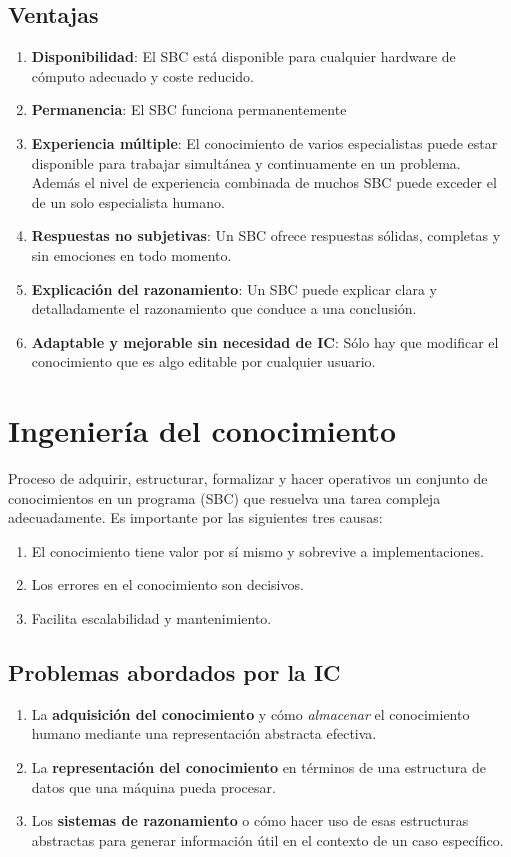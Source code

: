 \documentclass[12pt]{article}
\begin{document}
\subsection{Ventajas}
\begin{enumerate}
\item \textbf{Disponibilidad}: El SBC está disponible para cualquier hardware de cómputo adecuado y coste reducido.
\item \textbf{Permanencia}: El SBC funciona permanentemente
\item \textbf{Experiencia múltiple}: El conocimiento de varios especialistas puede estar disponible para trabajar simultánea y continuamente en un problema. Además el nivel de experiencia combinada de muchos SBC puede exceder el de un solo especialista humano.
\item \textbf{Respuestas no subjetivas}: Un SBC ofrece respuestas sólidas, completas y sin emociones en todo momento.
\item \textbf{Explicación del razonamiento}: Un SBC puede explicar clara y detalladamente el razonamiento que conduce a una conclusión.
\item \textbf{Adaptable y mejorable sin necesidad de IC}: Sólo hay que modificar el conocimiento que es algo editable por cualquier usuario.
\end{enumerate}

\section{Ingeniería del conocimiento}
Proceso de adquirir, estructurar, formalizar y hacer operativos un conjunto de conocimientos en un programa (SBC) que resuelva una tarea compleja adecuadamente.
Es importante por las siguientes tres causas:
\begin{enumerate}
\item El conocimiento tiene valor por sí mismo y sobrevive a implementaciones.
\item Los errores en el conocimiento son decisivos.
\item Facilita escalabilidad y mantenimiento.
\end{enumerate}

\subsection{Problemas abordados por la IC}
\begin{enumerate}
\item La \textbf{adquisición del conocimiento} y cómo \textit{almacenar} el conocimiento humano mediante una representación abstracta efectiva.
\item La \textbf{representación del conocimiento} en términos de una estructura de datos que una máquina pueda procesar.
\item Los \textbf{sistemas de razonamiento} o cómo hacer uso de esas estructuras abstractas para generar información útil en el contexto de un caso específico.
\end{enumerate}
\end{document}
